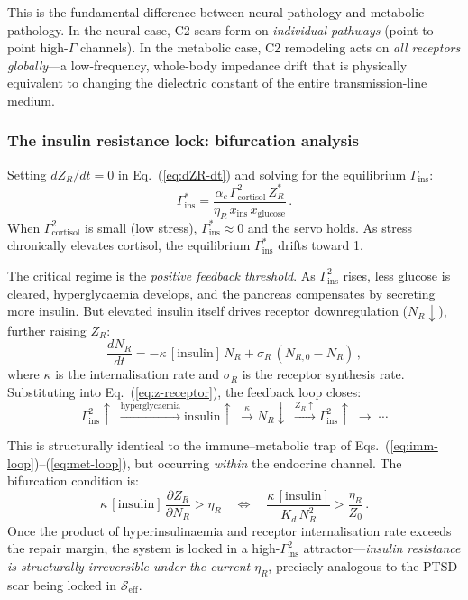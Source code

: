 \documentclass[aps,pre,twocolumn,superscriptaddress,floatfix]{revtex4-2}
\begin{document}
This is the fundamental difference between
neural pathology and metabolic pathology.
In the neural case, C2 scars form on
\emph{individual pathways} (point-to-point
high-$\Gamma$ channels).
In the metabolic case, C2 remodeling acts on
\emph{all receptors globally}---a low-frequency,
whole-body impedance drift that is physically
equivalent to changing the dielectric constant of
the entire transmission-line medium.

\subsubsection{The insulin resistance lock:
  bifurcation analysis}
\label{sec:ir-lock}

Setting $dZ_R/dt = 0$ in Eq.~(\ref{eq:dZR-dt})
and solving for the equilibrium $\Gamma_{\text{ins}}$:
\begin{equation}
  \Gamma_{\text{ins}}^*
  = \frac{\alpha_c\,\Gamma_{\text{cortisol}}^2\,Z_R^*}
         {\eta_R\,x_{\text{ins}}\,x_{\text{glucose}}}\,.
  \label{eq:ir-equilibrium}
\end{equation}
When $\Gamma_{\text{cortisol}}^2$ is small
(low stress), $\Gamma_{\text{ins}}^* \approx 0$
and the servo holds.
As stress chronically elevates cortisol, the
equilibrium $\Gamma_{\text{ins}}^*$ drifts toward 1.

The critical regime is the \emph{positive feedback
threshold}.
As $\Gamma_{\text{ins}}^2$ rises, less glucose is
cleared, hyperglycaemia develops, and the pancreas
compensates by secreting more insulin.
But elevated insulin itself drives receptor
downregulation ($N_R \downarrow$), further raising
$Z_R$:
\begin{equation}
  \frac{dN_R}{dt}
  = -\kappa\,[\text{insulin}]\,N_R
    + \sigma_R\,(N_{R,0} - N_R)\,,
  \label{eq:receptor-downreg}
\end{equation}
where $\kappa$ is the internalisation rate and
$\sigma_R$ is the receptor synthesis rate.
Substituting into Eq.~(\ref{eq:z-receptor}),
the feedback loop closes:
\[
  \Gamma_{\text{ins}}^2\!\uparrow
  \;\xrightarrow{\text{hyperglycaemia}}
  \text{insulin}\!\uparrow
  \;\xrightarrow{\kappa}
  N_R\!\downarrow
  \;\xrightarrow{Z_R\uparrow}
  \Gamma_{\text{ins}}^2\!\uparrow
  \;\to\;\cdots
\]

This is structurally identical to the immune--metabolic
trap of Eqs.~(\ref{eq:imm-loop})--(\ref{eq:met-loop}),
but occurring \emph{within} the endocrine channel.
The bifurcation condition is:
\begin{equation}
  \kappa\,[\text{insulin}]\,\frac{\partial Z_R}
    {\partial N_R}
  > \eta_R
  \quad
  \Longleftrightarrow
  \quad
  \frac{\kappa\,[\text{insulin}]}
       {K_d\,N_R^2}
  > \frac{\eta_R}{Z_0}\,.
  \label{eq:ir-bifurcation}
\end{equation}
Once the product of hyperinsulinaemia and receptor
internalisation rate exceeds the repair margin,
the system is locked in a high-$\Gamma_{\text{ins}}^2$
attractor---\emph{insulin resistance is structurally
irreversible under the current $\eta_R$}, precisely
analogous to the PTSD scar being locked in
$\mathcal{S}_{\text{eff}}$.
\end{document}

